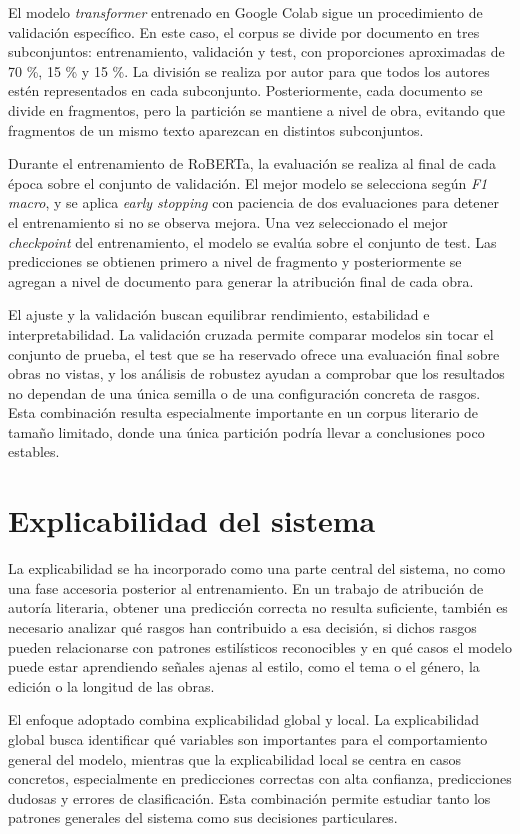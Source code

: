 \documentclass[IB]{TFUOC}%
\begin{document}
El modelo \textit{transformer} entrenado en Google Colab sigue un procedimiento de validación específico. En este caso, el corpus se divide por documento en tres subconjuntos: entrenamiento, validación y test, con proporciones aproximadas de 70 \%, 15 \% y 15 \%. La división se realiza por autor para que todos los autores estén representados en cada subconjunto. Posteriormente, cada documento se divide en fragmentos, pero la partición se mantiene a nivel de obra, evitando que fragmentos de un mismo texto aparezcan en distintos subconjuntos.

Durante el entrenamiento de RoBERTa, la evaluación se realiza al final de cada época sobre el conjunto de validación. El mejor modelo se selecciona según \textit{F1 macro}, y se aplica \textit{early stopping} con paciencia de dos evaluaciones para detener el entrenamiento si no se observa mejora. Una vez seleccionado el mejor \textit{checkpoint} del entrenamiento, el modelo se evalúa sobre el conjunto de test. Las predicciones se obtienen primero a nivel de fragmento y posteriormente se agregan a nivel de documento para generar la atribución final de cada obra.

El ajuste y la validación buscan equilibrar rendimiento, estabilidad e interpretabilidad. La validación cruzada permite comparar modelos sin tocar el conjunto de prueba, el test que se ha reservado ofrece una evaluación final sobre obras no vistas, y los análisis de robustez ayudan a comprobar que los resultados no dependan de una única semilla o de una configuración concreta de rasgos. Esta combinación resulta especialmente importante en un corpus literario de tamaño limitado, donde una única partición podría llevar a conclusiones poco estables.

\section{Explicabilidad del sistema}

La explicabilidad se ha incorporado como una parte central del sistema, no como una fase accesoria posterior al entrenamiento. En un trabajo de atribución de autoría literaria, obtener una predicción correcta no resulta suficiente, también es necesario analizar qué rasgos han contribuido a esa decisión, si dichos rasgos pueden relacionarse con patrones estilísticos reconocibles y en qué casos el modelo puede estar aprendiendo señales ajenas al estilo, como el tema o el género, la edición o la longitud de las obras.

El enfoque adoptado combina explicabilidad global y local. La explicabilidad global busca identificar qué variables son importantes para el comportamiento general del modelo, mientras que la explicabilidad local se centra en casos concretos, especialmente en predicciones correctas con alta confianza, predicciones dudosas y errores de clasificación. Esta combinación permite estudiar tanto los patrones generales del sistema como sus decisiones particulares.
\end{document}
